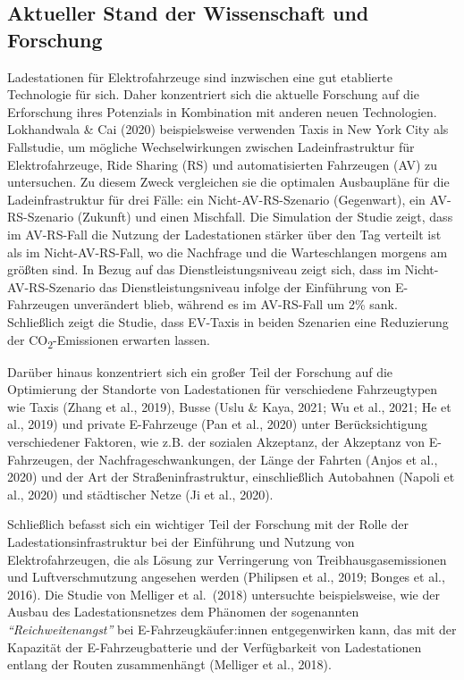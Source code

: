 \documentclass[
]{book}
\begin{document}
\hypertarget{aktueller-stand-der-wissenschaft-und-forschung-8}{%
\subsection*{Aktueller Stand der Wissenschaft und Forschung}\label{aktueller-stand-der-wissenschaft-und-forschung-8}}

Ladestationen für Elektrofahrzeuge sind inzwischen eine gut etablierte Technologie für sich. Daher konzentriert sich die aktuelle Forschung auf die Erforschung ihres Potenzials in Kombination mit anderen neuen Technologien. Lokhandwala \& Cai (2020) beispielsweise verwenden Taxis in New York City als Fallstudie, um mögliche Wechselwirkungen zwischen Ladeinfrastruktur für Elektrofahrzeuge, Ride Sharing (RS) und automatisierten Fahrzeugen (AV) zu untersuchen. Zu diesem Zweck vergleichen sie die optimalen Ausbaupläne für die Ladeinfrastruktur für drei Fälle: ein Nicht-AV-RS-Szenario (Gegenwart), ein AV-RS-Szenario (Zukunft) und einen Mischfall. Die Simulation der Studie zeigt, dass im AV-RS-Fall die Nutzung der Ladestationen stärker über den Tag verteilt ist als im Nicht-AV-RS-Fall, wo die Nachfrage und die Warteschlangen morgens am größten sind. In Bezug auf das Dienstleistungsniveau zeigt sich, dass im Nicht-AV-RS-Szenario das Dienstleistungsniveau infolge der Einführung von E-Fahrzeugen unverändert blieb, während es im AV-RS-Fall um 2\% sank. Schließlich zeigt die Studie, dass EV-Taxis in beiden Szenarien eine Reduzierung der CO\textsubscript{2}-Emissionen erwarten lassen.

Darüber hinaus konzentriert sich ein großer Teil der Forschung auf die Optimierung der Standorte von Ladestationen für verschiedene Fahrzeugtypen wie Taxis (Zhang et al., 2019), Busse (Uslu \& Kaya, 2021; Wu et al., 2021; He et al., 2019) und private E-Fahrzeuge (Pan et al., 2020) unter Berücksichtigung verschiedener Faktoren, wie z.B. der sozialen Akzeptanz, der Akzeptanz von E-Fahrzeugen, der Nachfrageschwankungen, der Länge der Fahrten (Anjos et al., 2020) und der Art der Straßeninfrastruktur, einschließlich Autobahnen (Napoli et al., 2020) und städtischer Netze (Ji et al., 2020).

Schließlich befasst sich ein wichtiger Teil der Forschung mit der Rolle der Ladestationsinfrastruktur bei der Einführung und Nutzung von Elektrofahrzeugen, die als Lösung zur Verringerung von Treibhausgasemissionen und Luftverschmutzung angesehen werden (Philipsen et al., 2019; Bonges et al., 2016). Die Studie von Melliger et al.~(2018) untersuchte beispielsweise, wie der Ausbau des Ladestationsnetzes dem Phänomen der sogenannten \emph{``Reichweitenangst''} bei E-Fahrzeugkäufer:innen entgegenwirken kann, das mit der Kapazität der E-Fahrzeugbatterie und der Verfügbarkeit von Ladestationen entlang der Routen zusammenhängt (Melliger et al., 2018).
\end{document}

